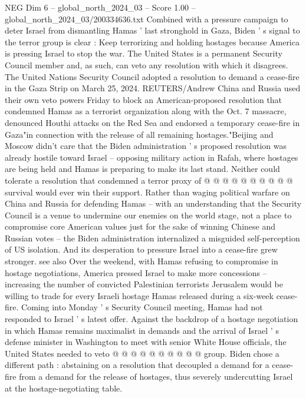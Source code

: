\begin{textsample}{NEG Dim 6 – global\_north\_2024\_03 – Score 1.00 – global\_north\_2024\_03/200334636.txt}  \label{ex:f6_neg_404}
Combined with a pressure campaign to deter Israel from dismantling Hamas ' last stronghold in Gaza, Biden ' s signal to the terror group is clear : Keep terrorizing and holding hostages because America is pressing Israel to stop the war.
The United States is a permanent Security Council member and, as such, can veto any resolution with which it disagrees.
The United Nations Security Council adopted a resolution to demand a cease-fire in the Gaza Strip on March 25, 2024.
REUTERS/Andrew China and Russia used their own veto powers Friday to block an American-proposed resolution that condemned Hamas as a terrorist organization along with the Oct. 7 massacre, denounced Houthi attacks on the Red Sea and endorsed a temporary cease-fire in Gaza"in connection with the release of all remaining hostages."Beijing and Moscow didn't care that the Biden administration ' s proposed resolution was already hostile toward Israel -- opposing military action in Rafah, where hostages are being held and Hamas is preparing to make its last stand.
Neither could tolerate a resolution that condemned a terror proxy of @ @ @ @ @ @ @ @ @ @ survival would ever win their support.
Rather than waging political warfare on China and Russia for defending Hamas -- with an understanding that the Security Council is a venue to undermine our enemies on the world stage, not a place to compromise core American values just for the sake of winning Chinese and Russian votes -- the Biden administration internalized a misguided self-perception of US isolation.
And its desperation to pressure Israel into a cease-fire grew stronger. see also Over the weekend, with Hamas refusing to compromise in hostage negotiations, America pressed Israel to make more concessions -- increasing the number of convicted Palestinian terrorists Jerusalem would be willing to trade for every Israeli hostage Hamas released during a six-week cease-fire.
Coming into Monday ' s Security Council meeting, Hamas had not responded to Israel ' s latest offer.
Against the backdrop of a hostage negotiation in which Hamas remains maximalist in demands and the arrival of Israel ' s defense minister in Washington to meet with senior White House officials, the United States needed to veto @ @ @ @ @ @ @ @ @ @ group.
Biden chose a different path : abstaining on a resolution that decoupled a demand for a cease-fire from a demand for the release of hostages, thus severely undercutting Israel at the hostage-negotiating table.

\end{textsample}
